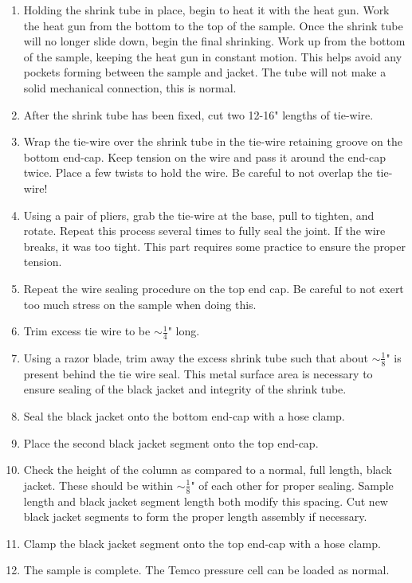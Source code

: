\begin{enumerate}
\item{Holding the shrink tube in place, begin to heat it with the heat gun.  Work the heat gun from the bottom to the top of the sample.  Once the shrink tube will no longer slide down, begin the final shrinking.  Work up from the bottom of the sample, keeping the heat gun in constant motion.  This helps avoid any pockets forming between the sample and jacket.  The tube will not make a solid mechanical connection, this is normal.}

\item{After the shrink tube has been fixed, cut two 12-16" lengths of tie-wire.}

\item{Wrap the tie-wire over the shrink tube in the tie-wire retaining groove on the bottom end-cap.  Keep tension on the wire and pass it around the end-cap twice.  Place a few twists to hold the wire.  Be careful to not overlap the tie-wire!}

\item{Using a pair of pliers, grab the tie-wire at the base, pull to tighten, and rotate.  Repeat this process several times to fully seal the joint.  If the wire breaks, it was too tight.  This part requires some practice to ensure the proper tension.}

\item{Repeat the wire sealing procedure on the top end cap.  Be careful to not exert too much stress on the sample when doing this.}

\item{Trim excess tie wire to be $\sim \frac{1}{4}$" long.}

\item{Using a razor blade, trim away the excess shrink tube such that about  $\sim \frac{1}{8}$" is present behind the tie wire seal.  This metal surface area is necessary to ensure sealing of the black jacket and integrity of the shrink tube.}

\item{Seal the black jacket onto the bottom end-cap with a hose clamp.}

\item{Place the second black jacket segment onto the top end-cap.}

\item{Check the height of the column as compared to a normal, full length, black jacket.  These should be within  $\sim \frac{1}{8}$" of each other for proper sealing.  Sample length and black jacket segment length both modify this spacing.  Cut new black jacket segments to form the proper length assembly if necessary.}

\item{Clamp the black jacket segment onto the top end-cap with a hose clamp.}

\item{The sample is complete.  The Temco pressure cell can be loaded as normal.}

\end{enumerate}

